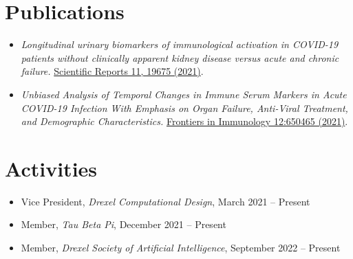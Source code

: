 \documentclass[letterpaper,11pt]{article}
\newcommand{\reusmeSubHeadingListSmallStart}{\begin{itemize}[itemsep=-4pt, parsep=4pt]}
\newcommand{\resumeSubHeadingListSmallEnd}{\end{itemize}}
\begin{document}

\section{Publications}
\vspace{-3pt}

\reusmeSubHeadingListSmallStart
    \item\small {
        \emph{
            Longitudinal urinary biomarkers of immunological activation in COVID-19
            patients without clinically apparent kidney disease versus acute and 
            chronic failure.
        } 
        \href{https://www.nature.com/articles/s41598-021-99102-5.pdf?proof=tr} 
        {Scientific Reports 11, 19675 (2021)}.
    }
    
    \item\small {
        \emph{
            Unbiased Analysis of Temporal Changes in Immune Serum Markers in Acute 
            COVID-19 Infection With Emphasis on Organ Failure, Anti-Viral Treatment, 
            and Demographic Characteristics.
        } 
        \href{https://www.frontiersin.org/articles/10.3389/fimmu.2021.650465/full} 
        {Frontiers in Immunology 12:650465 (2021)}.
    }
\resumeSubHeadingListSmallEnd

\vspace{-20pt}



\section{Activities}

\reusmeSubHeadingListSmallStart
\vspace{-3pt}    
    \item\small {
        Vice President, \emph{Drexel Computational Design}, March 2021 -- Present
    }
    \item\small {
        Member, \emph{Tau Beta Pi}, December 2021 -- Present
    }
    \item\small {
        Member, \emph{Drexel Society of Artificial Intelligence}, September 2022 -- Present
    }
\resumeSubHeadingListSmallEnd
\end{document}
